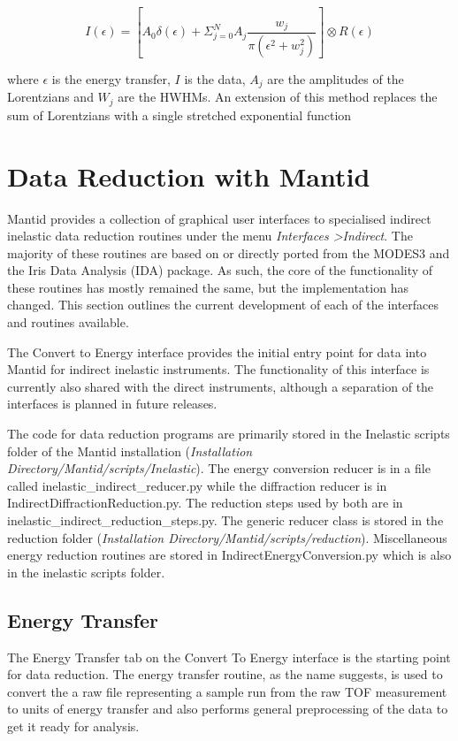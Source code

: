 \documentclass[paper=a4, fontsize=11pt]{scrartcl}	%
\numberwithin{equation}{section}															%
\numberwithin{figure}{section}																%
\numberwithin{table}{section}																%
\begin{document}
\begin{equation}
I(\epsilon) = [A_0\delta(\epsilon) + \Sigma_{j=0}^N A_j \frac{w_j}{\pi(\epsilon^2 + w_j^2)}] \otimes R(\epsilon)
\end{equation}

where $\epsilon$ is the energy transfer, $I$ is the data, $A_j$ are the amplitudes of the Lorentzians and $W_j$ are the HWHMs. An extension of this method replaces the sum of Lorentzians with a single stretched exponential function

\section{Data Reduction with Mantid}
Mantid provides a collection of graphical user interfaces to specialised indirect inelastic data reduction routines under the menu \textit{Interfaces \textgreater Indirect}. The majority of these routines are based on or directly ported from the MODES3 and the Iris Data Analysis (IDA) package\cite{wshowells2010}. As such, the core of the functionality of these routines has mostly remained the same, but the implementation has changed. This section outlines the current development of each of the interfaces and routines available.

The Convert to Energy interface provides the initial entry point for data into Mantid for indirect inelastic instruments. The functionality of this interface is currently also shared with the direct instruments, although a separation of the interfaces is planned in future releases.

The code for data  reduction programs are primarily stored in the Inelastic scripts folder of the Mantid installation (\textit{Installation Directory/Mantid/scripts/Inelastic}). The energy conversion reducer is in a file called inelastic\_indirect\_reducer.py while the diffraction reducer is in IndirectDiffractionReduction.py. The reduction steps used by both are in inelastic\_indirect\_reduction\_steps.py. The generic reducer class is stored in the reduction folder (\textit{Installation Directory/Mantid/scripts/reduction}). Miscellaneous energy reduction routines are stored in IndirectEnergyConversion.py which is also in the inelastic scripts folder.

\subsection{Energy Transfer}
\label{sec:energy-transfer}
The Energy Transfer tab on the Convert To Energy interface is the starting point for data reduction. The energy transfer routine, as the name suggests, is used to convert the a raw file representing a sample run from the raw TOF measurement to units of energy transfer and also performs general preprocessing of the data to get it ready for analysis.
\end{document}
